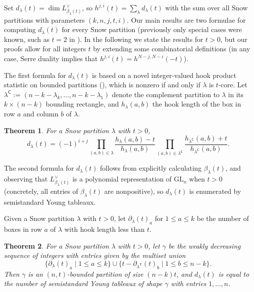 \documentclass{amsart}
\newcommand\C{\mathsf{C}}
\newcommand\T{\mathsf{T}}
\newcommand\GL{\mathrm{GL}}
\theoremstyle{plain}
\newtheorem{theorem}{Theorem}[section]
\theoremstyle{definition}
\numberwithin{equation}{section}
\begin{document}
Set $d_\lambda(t)=\dim L_{\beta_\lambda(t)}^\vee$, so $h^{j,i}(t)=\sum_\lambda d_\lambda(t)$ with the sum over all Snow partitions with parameters $(k,n,j,t,i)$. Our main results are two formulae for computing $d_\lambda(t)$ for every Snow partition (previously only special cases were known, such as $t=2$ in \cite{Sno86}). In the following we state the results for $t>0$, but our proofs allow for all integers $t$ by extending some combinatorial definitions (in any case, Serre duality implies that $h^{j,i}(t)=h^{N-j,N-i}(-t)$).

The first formula for $d_\lambda(t)$ is based on a novel integer-valued hook product statistic on bounded partitions (), which is nonzero if and only if $\lambda$ is $t$-core. Let $\lambda^\C:=(n-k-\lambda_k,\dots,n-k-\lambda_1)$ denote the complement partition to $\lambda$ in its $k\times (n-k)$ bounding rectangle, and $h_\lambda(a,b)$ the hook length of the box in row $a$ and column $b$ of $\lambda$.

\begin{theorem}\label{thm:dimension-formula-intro}
For a Snow partition $\lambda$ with $t>0$,
\[d_\lambda(t)=(-1)^{i+j}\prod_{(a,b)\in\lambda}\frac{h_{\lambda}(a,b)-t}{h_\lambda(a,b)}\prod_{(a,b)\in\lambda^\C}\frac{h_{\lambda^\C}(a,b)+t}{h_{\lambda^\C}(a,b)}.\]
\end{theorem}

The second formula for $d_\lambda(t)$ follows from explicitly calculating $\beta_\lambda(t)$, and observing that $L_{\beta_\lambda(t)}^\vee$ is a polynomial representation of $\GL_n$ when $t>0$ (concretely, all entries of $\beta_\lambda(t)$ are nonpositive), so $d_\lambda(t)$ is enumerated by semistandard Young tableaux.

Given a Snow partition $\lambda$ with $t>0$, let $\partial_\lambda(t)_a$ for $1\leq a\leq k$ be the number of boxes in row $a$ of $\lambda$ with hook length less than $t$.

\begin{theorem}\label{thm:gamma-dimension-intro}
For a Snow partition $\lambda$ with $t>0$, let $\gamma$ be the weakly decreasing sequence of integers with entries given by the multiset union
\[\{\partial_\lambda(t)_a\mid 1\leq a\leq k\}\cup\{t-\partial_{\lambda^\T}(t)_b\mid 1\leq b\leq n-k\}.\]
Then $\gamma$ is an $(n,t)$-bounded partition of size $(n-k)t$, and $d_\lambda(t)$ is equal to the number of semistandard Young tableaux of shape $\gamma$ with entries $1,\dots,n$.
\end{theorem}
\end{document}
